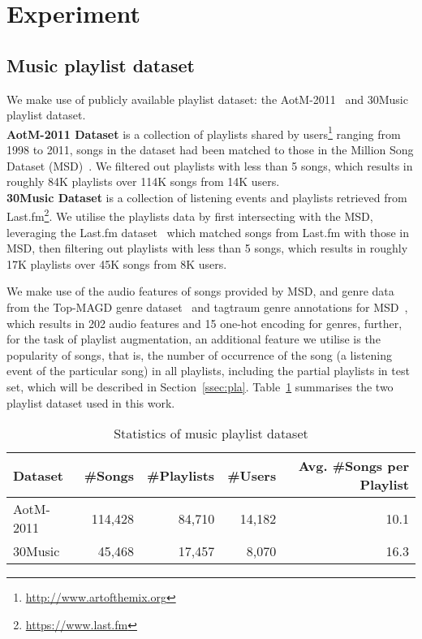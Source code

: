 \section{Experiment}
\label{sec:experiment}

\subsection{Music playlist dataset}
We make use of publicly available playlist dataset: the AotM-2011~\cite{mcfee2012hypergraph} and 30Music~\cite{30music2015} playlist dataset. \\
%
{\bf AotM-2011 Dataset} is a collection of playlists shared by users\footnote{\url{http://www.artofthemix.org}} ranging from 1998 to 2011, 
songs in the dataset had been matched to those in the Million Song Dataset (MSD)~\cite{msd2011}.
We filtered out playlists with less than 5 songs, which results in roughly 84K playlists over 114K songs from 14K users. \\
%
{\bf 30Music Dataset} is a collection of listening events and playlists retrieved from Last.fm\footnote{\url{https://www.last.fm}}.
We utilise the playlists data by first intersecting with the MSD, leveraging the Last.fm dataset~\cite{lastfmdataset} 
which matched songs from Last.fm with those in MSD, then filtering out playlists with less than 5 songs, 
which results in roughly 17K playlists over 45K songs from 8K users.

We make use of the audio features of songs provided by MSD, 
and genre data from the Top-MAGD genre dataset~\cite{schindler2012facilitating} and tagtraum genre annotations for MSD~\cite{schreiber2015improving},
which results in 202 audio features and 15 one-hot encoding for genres,
further, for the task of playlist augmentation, an additional feature we utilise is the popularity of songs,
that is, the number of occurrence of the song (\ie a listening event of the particular song) in all playlists,
including the partial playlists in test set, which will be described in Section~\ref{ssec:pla}.
%
%
Table~\ref{tab:stats_pldata} summarises the two playlist dataset used in this work.
%
\begin{table}[!h]
\centering
\caption{Statistics of music playlist dataset}
\label{tab:stats_pldata}
\small
\begin{tabular}{l|rrrr}
\toprule
Dataset   & \#Songs & \#Playlists & \#Users & Avg. \#Songs per Playlist \\
\midrule
AotM-2011 & 114,428 & 84,710      & 14,182  & 10.1 \\
30Music   & 45,468  & 17,457      & 8,070   & 16.3 \\
\bottomrule
\end{tabular}
\end{table}


